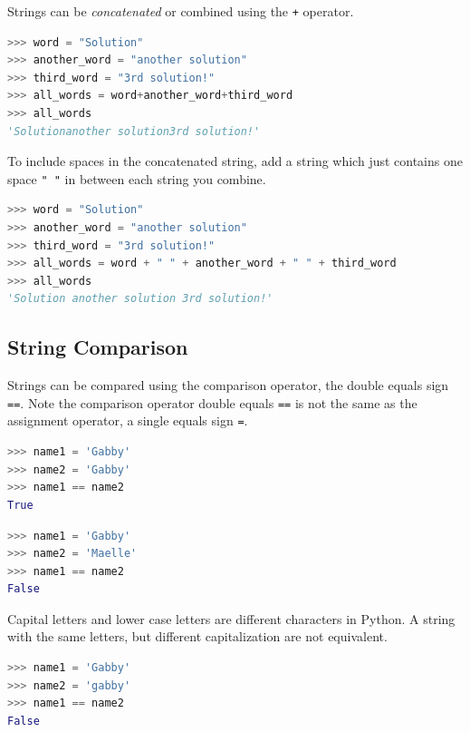 \documentclass{book}
\begin{document}
    
        Strings can be \emph{concatenated} or combined using the \lstinline!+!
operator.

\begin{lstlisting}[language=Python]
>>> word = "Solution"
>>> another_word = "another solution"
>>> third_word = "3rd solution!"
>>> all_words = word+another_word+third_word
>>> all_words
'Solutionanother solution3rd solution!'
\end{lstlisting}

To include spaces in the concatenated string, add a string which just
contains one space \lstinline!" "! in between each string you combine.

\begin{lstlisting}[language=Python]
>>> word = "Solution"
>>> another_word = "another solution"
>>> third_word = "3rd solution!"
>>> all_words = word + " " + another_word + " " + third_word
>>> all_words
'Solution another solution 3rd solution!'
\end{lstlisting}
    




    
        \subsection{String Comparison}\label{string-comparison}
    




    
        Strings can be compared using the comparison operator, the double equals
sign \lstinline!==!. Note the comparison operator double equals
\lstinline!==! is not the same as the assignment operator, a single
equals sign \lstinline!=!.

\begin{lstlisting}[language=Python]
>>> name1 = 'Gabby'
>>> name2 = 'Gabby'
>>> name1 == name2
True
\end{lstlisting}

\begin{lstlisting}[language=Python]
>>> name1 = 'Gabby'
>>> name2 = 'Maelle'
>>> name1 == name2
False
\end{lstlisting}

Capital letters and lower case letters are different characters in
Python. A string with the same letters, but different capitalization are
not equivalent.

\begin{lstlisting}[language=Python]
>>> name1 = 'Gabby'
>>> name2 = 'gabby'
>>> name1 == name2
False
\end{lstlisting}
    
\end{document}

